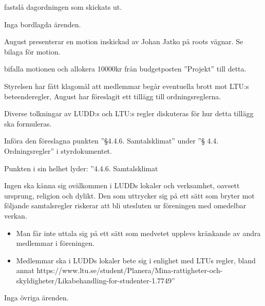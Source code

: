\documentclass{protokoll}
\begin{document}
\newpage  


\begin{beslut}
     \att fastslå dagordningen som skickats ut.
\end{beslut}

Inga bordlagda ärenden.

August presenterar en motion inskickad av Johan Jatko på roots vägnar. Se
bilaga för motion. 
\begin{beslut}
    \att bifalla motionen och allokera 10000kr från budgetposten ''Projekt'' till detta.
\end{beslut}

Styrelsen har fått klagomål att medlemmar begår eventuella brott mot LTU:s 
beteenderegler, August har föreslagit ett tillägg till ordningsreglerna.  

Diverse tolkningar av LUDD:s och LTU:s regler diskuteras för hur detta tillägg
ska formuleras. 

\begin{beslut}
  \att Införa den föreslagna punkten ''\S 4.4.6. Samtalsklimat'' under ''\S
  4.4. Ordningsregler'' i styrdokumentet. 
\end{beslut}
Punkten i sin helhet lyder: 
''4.4.6. Samtalsklimat


Ingen ska känna sig ovälkommen i LUDDs lokaler och verksamhet, oavsett ursprung, religion och dylikt. Den som uttrycker sig på ett sätt som bryter mot följande samtalsregler riskerar att bli utesluten ur föreningen med omedelbar verkan.

\begin{itemize}
  \item Man får inte uttala sig på ett sätt som medvetet upplevs kränkande av andra medlemmar i föreningen.
  \item Medlemmar ska i LUDDs lokaler bete sig i enlighet med LTUs regler, bland annat https://www.ltu.se/student/Planera/Mina-rattigheter-och-skyldigheter/Likabehandling-for-studenter-1.7749''
\end{itemize}

Inga övriga ärenden.
\end{document}
